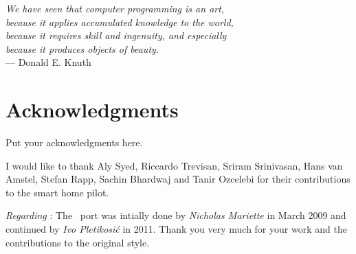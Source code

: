 \cleardoublepage

\begin{flushright}{\slshape    
    We have seen that computer programming is an art, \\ 
    because it applies accumulated knowledge to the world, \\ 
    because it requires skill and ingenuity, and especially \\
    because it produces objects of beauty.} \\ \medskip
    --- {Donald E. Knuth}%
\end{flushright}



\bigskip

\begingroup
\let\clearpage\relax
\let\cleardoublepage\relax
\let\cleardoublepage\relax
\chapter*{Acknowledgments}
Put your acknowledgments here.

I would like to thank Aly Syed, Riccardo Trevisan, Sriram Srinivasan, Hans van Amstel, Stefan Rapp, Sachin Bhardwaj and Tanir Ozcelebi for their contributions to the smart home pilot.



\bigskip

\noindent\emph{Regarding \mLyX}: The \mLyX\ port was intially done by 
\emph{Nicholas Mariette} in March 2009 and continued by 
\emph{Ivo Pletikosi\'c} in 2011. Thank you very much for your 
work and the contributions to the original style.


\endgroup



